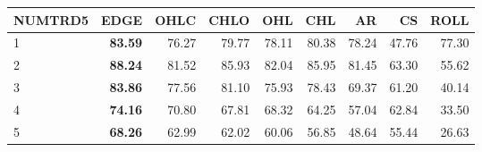 \begin{table}[ht]
\centering
\begin{tabular}{lrrrrrrrr}
  \hline
NUMTRD5 & EDGE & OHLC & CHLO & OHL & CHL & AR & CS & ROLL \\ 
  \hline
1 & \textbf{83.59} & 76.27 & 79.77 & 78.11 & 80.38 & 78.24 & 47.76 & 77.30 \\ 
  2 & \textbf{88.24} & 81.52 & 85.93 & 82.04 & 85.95 & 81.45 & 63.30 & 55.62 \\ 
  3 & \textbf{83.86} & 77.56 & 81.10 & 75.93 & 78.43 & 69.37 & 61.20 & 40.14 \\ 
  4 & \textbf{74.16} & 70.80 & 67.81 & 68.32 & 64.25 & 57.04 & 62.84 & 33.50 \\ 
  5 & \textbf{68.26} & 62.99 & 62.02 & 60.06 & 56.85 & 48.64 & 55.44 & 26.63 \\ 
   \hline
\end{tabular}
\end{table}
